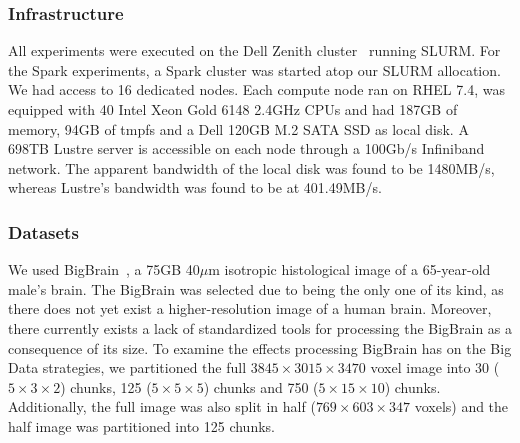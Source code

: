 \documentclass{IEEEtran}
\begin{document}
\subsubsection{Infrastructure} %

All experiments were executed on the Dell Zenith cluster~\cite{dellHPC} running 
SLURM. For the 
Spark experiments, a Spark cluster was started atop our SLURM allocation. We
had access to 16 dedicated nodes. Each compute node ran on RHEL 7.4, was 
equipped with 40 Intel Xeon Gold 6148 2.4GHz CPUs and had
187GB of memory, 94GB of tmpfs and a Dell 120GB M.2 SATA SSD as local disk. 
A 698TB Lustre server is accessible on each node through a 100Gb/s Infiniband
network. The apparent bandwidth of the local disk was found to be 1480MB/s, 
whereas Lustre's bandwidth was found to be at 401.49MB/s.



\subsubsection{Datasets} %

We used BigBrain~\cite{bigbrain}, a 75GB 40$\mu$m isotropic 
histological image of a 65-year-old male's brain. The BigBrain was selected due 
to being the only one of its kind, as there does not yet exist a 
higher-resolution image of a human brain. Moreover, there currently exists a 
lack of standardized tools for processing the BigBrain as a consequence 
of its size. To examine the effects processing BigBrain has on the Big Data 
strategies, we partitioned the full $3845\times3015\times3470$ voxel image into 30 ($5\times3\times2$)
chunks, 125 ($5\times5\times5$) chunks and 750 ($5\times15\times10$) chunks. Additionally, the full 
image was also split in half ($769\times603\times347$ voxels) and the half image was 
partitioned into 125 chunks.
\end{document}
